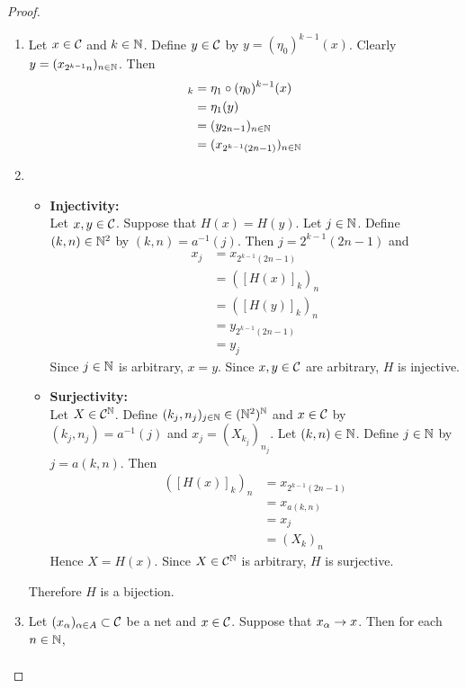 \documentclass{book}
\begin{document}
	\begin{proof}\
		\begin{enumerate}
			\item Let $x \in \mathcal{C}$ and $k \in \mathbb{N}$. Define $y \in \mathcal{C}$ by $ y = (\eta_0)^{k-1}(x)$. Clearly $y = (x_{2^{k-1}n})_{n \in \mathbb{N}}$. Then 
			\begin{align*}
				[H(x)]_k
				& = \eta_1 \circ (\eta_0)^{k-1}(x) \\
				& = \eta_1(y) \\
				& = (y_{2n-1})_{n \in \N} \\
				& =  (x_{2^{k-1}(2n-1)})_{n \in \N}
			\end{align*}
			\item  
			\begin{itemize}
				\item \textbf{Injectivity:} \\
				Let $x, y \in \mathcal{C}$. Suppose that $H(x) = H(y)$. Let $j \in \mathbb{N}$. Define $(k,n) \in \mathbb{N}^2$ by $(k,n) = a^{-1}(j)$. Then $j = 2^{k-1}(2n-1)$ and
				\begin{align*}
					x_j
					& = x_{2^{k-1}(2n-1)} \\
					& = ([H(x)]_k)_n \\
					& = ([H(y)]_k)_n \\
					& = y_{2^{k-1}(2n-1)} \\
					& = y_j
				\end{align*}
				Since $j \in \mathbb{N}$ is arbitrary, $x = y$. Since $x,y \in \mathcal{C}$ are arbitrary, $H$ is injective.
				\item \textbf{Surjectivity:} \\
				Let $X \in \mathcal{C}^{\mathbb{N}}$. Define $(k_j,n_j)_{j \in \mathbb{N}} \in (\mathbb{N}^2)^{\mathbb{N}}$ and $x \in \mathcal{C}$ by $(k_j,n_j) = a^{-1}(j)$ and $x_j = (X_{k_j})_{n_j}$. Let $(k,n) \in \mathbb{N}$. Define $j \in \mathbb{N}$ by $j = a(k,n)$. Then
				\begin{align*}
					([H(x)]_{k})_{n} 
					& = x_{2^{k-1}(2n-1)} \\
					& = x_{a(k, n)} \\
					& = x_j \\
					& = (X_{k})_{n}
				\end{align*}
				Hence $X = H(x)$. Since $X \in \mathcal{C}^{\mathbb{N}}$ is arbitrary, $H$ is surjective.
			\end{itemize}
			Therefore $H$ is a bijection.
			\item Let $(x_{\alpha})_{\alpha \in A} \subset \mathcal{C}$ be a net and $x \in \mathcal{C}$. Suppose that $x_{\alpha} \rightarrow x$. Then for each $n \in \mathbb{N}$, 
			\begin{align*}

\end{align*}
\end{enumerate}
\end{proof}
\end{document}
